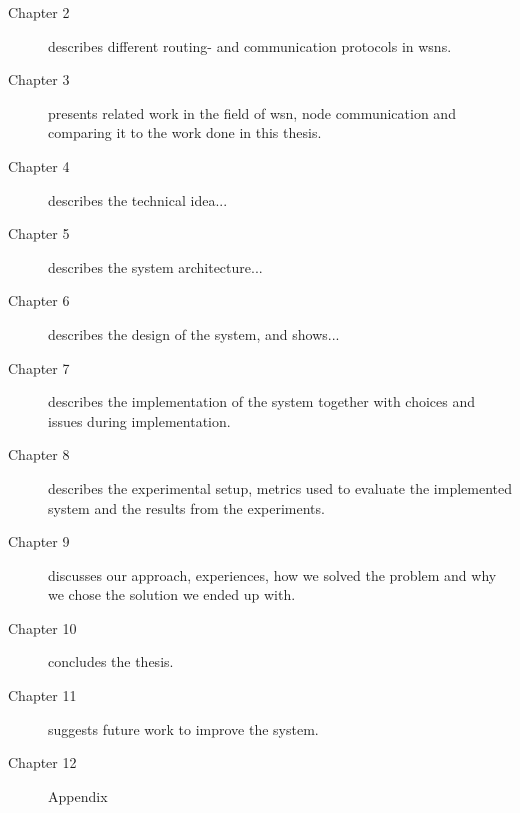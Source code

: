 \documentclass[USenglish]{uit-thesis}
\newcommand{\definition}[1]{%
  \refstepcounter{definition}%
  \par\noindent\textbf{The Definition~\thedefinition. #1}%
  \addcontentsline{def}{definition}
    {\protect\numberline{\thechapter.\thedefinition}#1}\par%
}
\begin{document}
\begin{description}
\item[Chapter 2] describes different routing- and communication protocols in \gls{wsn}s.
\item[Chapter 3] presents related work in the field of \gls{wsn}, node communication and comparing it to the work done in this thesis.
\item[Chapter 4] describes the technical idea...
\item[Chapter 5] describes the system architecture...
\item[Chapter 6] describes the design of the system, and shows...
\item[Chapter 7] describes the implementation of the system together with choices and issues during implementation.
\item[Chapter 8] describes the experimental setup, metrics used to evaluate the implemented system and the results from the experiments.
\item[Chapter 9] discusses our approach, experiences, how we solved the problem and why we chose the solution we ended up with.
\item[Chapter 10] concludes the thesis.
\item[Chapter 11] suggests future work to improve the system.
\item[Chapter 12] Appendix
\end{description}








\end{document}
